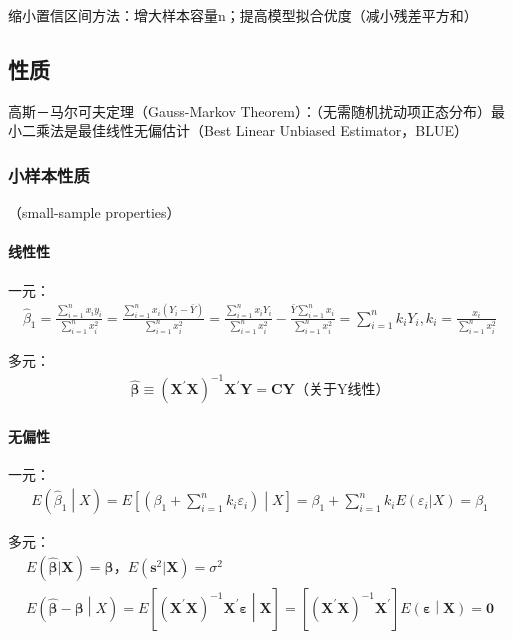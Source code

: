 \documentclass[12pt]{book}
\begin{document}
缩小置信区间方法：增大样本容量n；提高模型拟合优度（减小残差平方和）

\subsection{性质}

高斯－马尔可夫定理（Gauss-Markov Theorem）：（无需随机扰动项正态分布）最小二乘法是最佳线性无偏估计（Best Linear Unbiased Estimator，BLUE）

\subsubsection{小样本性质}

（small-sample properties）


\paragraph{线性性}

一元：
\begin{gather*}
    {\hat{\beta}}_1=\frac{\sum_{i=1}^{n}{x_iy_i}}{\sum_{i=1}^{n}x_i^2}=\frac{\sum_{i=1}^{n}{x_i\left(Y_i-\bar{Y}\right)}}{\sum_{i=1}^{n}x_i^2}=\frac{\sum_{i=1}^{n}{x_iY_i}}{\sum_{i=1}^{n}x_i^2}-\frac{\bar{Y}\sum_{i=1}^{n}x_i}{\sum_{i=1}^{n}x_i^2}=\sum_{i=1}^{n}{k_iY_i}, k_i=\frac{x_i}{\sum_{i=1}^{n}{x_i^2}}
\end{gather*}

多元：
\begin{gather*}
    \hat{\bm{\beta}}\equiv\left(\mathbf{X}^\prime\mathbf{X}\right)^{-1}\mathbf{X}^\prime\mathbf{Y}=\mathbf{CY}\text{（关于Y线性）}
\end{gather*}


\paragraph{无偏性}

一元：
\begin{gather*}
    E\left({\hat{\beta}}_1\middle| X\right)=E\left[\left(\beta_1+\sum_{i=1}^{n}{k_i\varepsilon_i}\right)\middle| X\right]=\beta_1+\sum_{i=1}^{n}{k_iE(\varepsilon_i|X)}=\beta_1
\end{gather*}


多元：
\begin{gather*}
    E(\hat{\bm{\beta}}|\bm{X}) =\bm{\beta}，E(\bm{s}^2|\bm{X})=\sigma^2\\
    E\left(\hat{\bm{\beta}}-\bm{\beta}\middle| X\right) =E\left[\left(\bm{X}^\prime\bm{X}\right)^{-1}\bm{X}^\prime\bm{\varepsilon}\middle|\bm{X}\right] =\left[\left(\bm{X}^\prime\bm{X}\right)^{-1}\bm{X}^\prime\right]E\left(\bm{\varepsilon}\middle|\bm{X}\right)=\bm{0}
\end{gather*}
\end{document}
